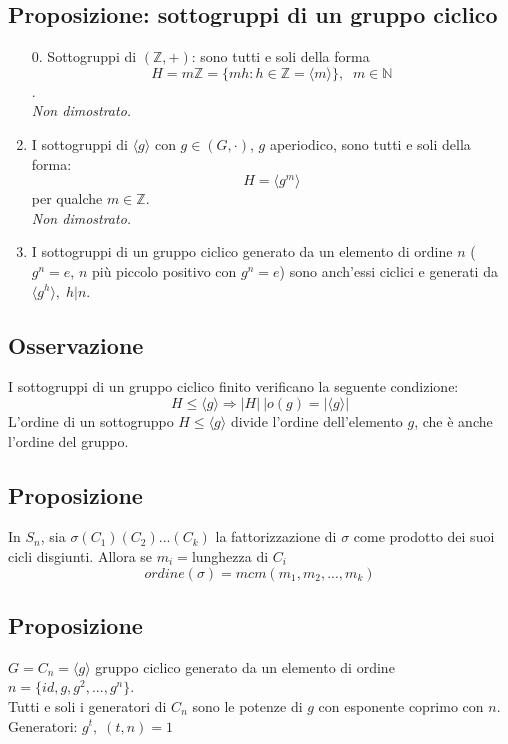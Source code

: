 \subsection{Proposizione: sottogruppi di un gruppo ciclico}
\begin{enumerate}
	
	\item[0.] Sottogruppi di \((\mathbb{Z},+)\): sono tutti e soli della forma \[H=m\mathbb{Z}=\{mh:h\in\mathbb{Z}=\langle m\rangle\},\;\;m\in\mathbb{N}\].
	\\\textit{Non dimostrato.}

	\item I sottogruppi di \(\langle g\rangle\) con \(g\in (G,\cdot)\), \(g\) aperiodico, sono tutti e soli della forma:
	\[H=\langle g^m\rangle\]
	per qualche \(m\in\mathbb{Z}\).
	\\\textit{Non dimostrato.}

	\item I sottogruppi di un gruppo ciclico generato da un elemento di ordine \(n\) (\(g^n=e\), \(n\) più piccolo positivo con \(g^n=e\)) sono anch'essi ciclici e generati da \(\langle g^h\rangle,\; h|n\).

\end{enumerate}

\subsection{Osservazione}
I sottogruppi di un gruppo ciclico finito verificano la seguente condizione:
\[H\leq\langle g\rangle\Rightarrow\vert H|\:| o(g)=|\langle g\rangle|\]
L'ordine di un sottogruppo \(H\leq\langle g\rangle\) divide l'ordine dell'elemento \(g\), che è anche l'ordine del gruppo.

\subsection{Proposizione}
In \(S_n\), sia \(\sigma (C_1)(C_2)...(C_k)\) la fattorizzazione di \(\sigma\) come prodotto dei suoi cicli disgiunti. Allora se \(m_i=\)lunghezza di \(C_i\)
\[ordine(\sigma)=mcm(m_1,m_2,...,m_k)\]

\subsection{Proposizione}
\(G=C_n=\langle g\rangle\) gruppo ciclico generato da un elemento di ordine \(n=\{id,g,g^2,...,g^n\}\). 
\\Tutti e soli i generatori di \(C_n\) sono le potenze di \(g\) con esponente coprimo con \(n\).
\\Generatori: \(g^t,\;(t,n)=1\)

